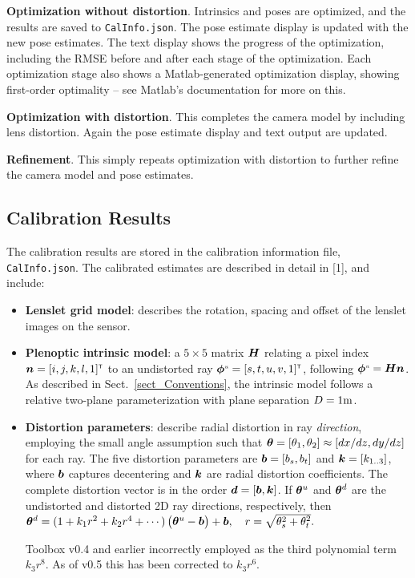 \documentclass[onecolumn]{article}
\newcommand{\SymbolText}[1]{\texttt{\small #1}}
\begin{document}
\textbf{Optimization without distortion}.  Intrinsics and poses are optimized, and the results are saved to \SymbolText{CalInfo.json}.  The pose estimate display is updated with the new pose estimates. The text display shows the progress of the optimization, including the RMSE before and after each stage of the optimization.  Each optimization stage also shows a Matlab-generated optimization display, showing first-order optimality -- see Matlab's documentation for more on this.

\textbf{Optimization with distortion}. This completes the camera model by including lens distortion.  Again the pose estimate display and text output are updated.
 
\textbf{Refinement}.  This simply repeats optimization with distortion to further refine the camera model and pose estimates.

\subsection{Calibration Results}

The calibration results are stored in the calibration information file, \SymbolText{CalInfo.json}. The calibrated estimates are described in detail in [1], and include:

\begin{itemize}

\item \textbf{Lenslet grid model}: describes the rotation, spacing and offset of the lenslet images on the sensor.

\item \textbf{Plenoptic intrinsic model}: a $5 \times 5$ matrix $\mat{H}$ relating a pixel index $\bm{n} = [i,j,k,l,1]^{\scriptscriptstyle\mathsf{T}}$ to an undistorted ray $\bm{\phi}^{\scriptscriptstyle\mathit{u}} = [s,t,u,v,1]^{\scriptscriptstyle\mathsf{T}}$, following $\vect{\phi}\super{u} = \mat{H} \vect{n}$. As described in Sect.~\ref{sect_Conventions}, the intrinsic model follows a relative two-plane parameterization with plane separation $D=1 \mathrm{m}$.

\item \textbf{Distortion parameters}: describe radial distortion in ray \emph{direction}, employing the small angle assumption such that $\bm{\theta} = [\theta_1, \theta_2] \approx [dx/dz, dy/dz]$ for each ray. The five distortion parameters are $\bm{b} = [b_s,b_t]$ and $\bm{k} = [k_{1..3}]$, where $\bm{b}$ captures decentering and $\bm{k}$ are radial distortion coefficients.  The complete distortion vector is in the order $\bm{d} = [\bm{b}, \bm{k}]$. If $\bm{\theta}^u$ and $\bm{\theta}^d$ are the undistorted and distorted 2D ray directions, respectively, then\\ 
$
\bm{\theta}^d =
(1 + k_1 r^2 + k_2 r^4 + \cdots)
\begin{pmatrix}
\bm{\theta}^u
-
\bm{b}
\end{pmatrix}
+
\bm{b},
\quad
r = \sqrt{\theta_s^2 + \theta_t^2}.
$

Toolbox v0.4 and earlier incorrectly employed as the third polynomial term $k_3 r^8$. As of v0.5 this has been corrected to $k_3 r^6$.
\end{itemize}
\end{document}
